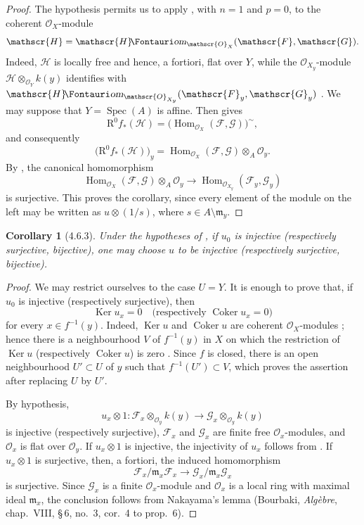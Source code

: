 \documentclass[oneside]{amsart}
\theoremstyle{ega-env-style}
\theoremstyle{ega-thm-env-style}
\newtheorem*{corollary}{Corollary}
\theoremstyle{ega-defn-env-style}
\def\mathcal{\mathscr}
\def\sh{\mathcal}                   %
\def\RR{\mathrm{R}}                 %
\def\kres{k}                        %
\def\Hom{\operatorname{Hom}}
\def\Ker{\operatorname{Ker}}
\def\Coker{\operatorname{Coker}}
\def\Spec{\operatorname{Spec}}
\def\shHom{\sh{H}\textup{\kern-2.2pt{\Fontauri\slshape om}}}   %
\newcommand{\oldpage}[2][]{{\marginnote{\normalfont{\textbf{#1}~|~#2}}}\ignorespaces}
\let\EGAOriginalLabel\label
\renewcommand{\label}[1]{\phantomsection\EGAOriginalLabel{#1}}
\begin{document}
\begin{proof}
The hypothesis permits us to apply , with $n=1$
and $p=0$, to the coherent $\sh{O}_X$-module
\[
  \sh{H}=\shHom_{\sh{O}_X}(\sh{F},\sh{G}).
\]
Indeed, $\sh{H}$ is locally free and hence, a fortiori, flat over
$Y$, while the $\sh{O}_{X_y}$-module
$\sh{H}\otimes_{\sh{O}_Y}\kres(y)$ identifies with
$\shHom_{\sh{O}_{X_y}}(\sh{F}_y,\sh{G}_y)$
.  We may suppose that $Y=\Spec(A)$ is affine.
Then  gives
\[
  \RR^0f_*(\sh{H})
  =
  \bigl(\Hom_{\sh{O}_X}(\sh{F},\sh{G})\bigr)^{\sim},
\]
and consequently
\[
  \bigl(\RR^0f_*(\sh{H})\bigr)_y
  =
  \Hom_{\sh{O}_X}(\sh{F},\sh{G})
    \otimes_A\sh{O}_y.
\]
By , the canonical homomorphism
\[
  \Hom_{\sh{O}_X}(\sh{F},\sh{G})
    \otimes_A\sh{O}_y
  \longrightarrow
  \Hom_{\sh{O}_{X_y}}(\sh{F}_y,\sh{G}_y)
\]
is surjective.  This proves the corollary, since every element of
the module on the left may be written as $u\otimes(1/s)$, where
$s\in A\setminus\mathfrak m_y$.
\end{proof}

\begin{corollary}[4.6.3]
\label{III.4.6.3}
Under the hypotheses of , if $u_0$ is injective
(respectively surjective, bijective), one may choose $u$ to be
injective (respectively surjective, bijective).
\end{corollary}

\begin{proof}
We may restrict ourselves to the case $U=Y$.  It is enough to prove
that, if $u_0$ is injective (respectively surjective), then
\[
  \Ker u_x=0
  \quad\text{(respectively }\Coker u_x=0\text{)}
\]
for every $x\in f^{-1}(y)$.  Indeed, $\Ker u$ and $\Coker u$ are
coherent $\sh{O}_X$-modules ; hence there is a
neighbourhood $V$ of $f^{-1}(y)$ in $X$ on which the restriction of
$\Ker u$ (respectively $\Coker u$) is zero .
Since $f$ is closed, there is an open neighbourhood
$U'\subset U$ of $y$ such that $f^{-1}(U')\subset V$, which proves
the assertion after replacing $U$ by $U'$.

\oldpage[III]{142}

By hypothesis,
\[
  u_x\otimes1:
  \sh{F}_x\otimes_{\sh{O}_y}\kres(y)
  \longrightarrow
  \sh{G}_x\otimes_{\sh{O}_y}\kres(y)
\]
is injective (respectively surjective), $\sh{F}_x$ and $\sh{G}_x$
are finite free $\sh{O}_x$-modules, and $\sh{O}_x$ is flat over
$\sh{O}_y$.  If $u_x\otimes1$ is injective, the injectivity of $u_x$
follows from .  If $u_x\otimes1$ is surjective,
then, a fortiori, the induced homomorphism
\[
  \sh{F}_x/\mathfrak m_x\sh{F}_x
  \longrightarrow
  \sh{G}_x/\mathfrak m_x\sh{G}_x
\]
is surjective.  Since $\sh{G}_x$ is a finite $\sh{O}_x$-module and
$\sh{O}_x$ is a local ring with maximal ideal $\mathfrak m_x$, the
conclusion follows from Nakayama's lemma (Bourbaki,
\emph{Alg\`ebre}, chap.~VIII, \S\,6, no.~3, cor.~4 to prop.~6).
\end{proof}
\end{document}
